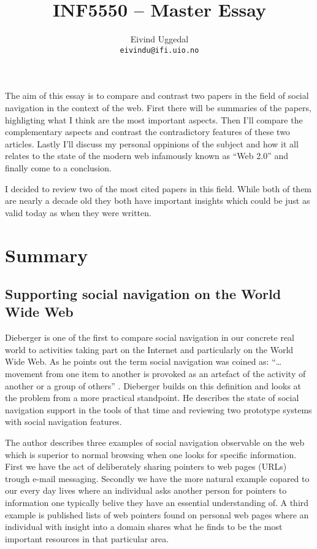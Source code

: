 \documentclass[12pt,a4paper]{article}
\author{Eivind Uggedal\\
  \texttt{eivindu@ifi.uio.no}}
\title{INF5550 -- Master Essay}
\begin{document}
\maketitle{}

The aim of this essay is to compare and contrast two papers in the field of
social navigation in the context of the web. First there will be summaries
of the papers, highligting what I think are the most important aspects.
Then I'll compare the complementary aspects and contrast the contradictory
features of these two articles. Lastly I'll discuss my personal
oppinions of the subject and how it all relates to the state of the modern web
infamously known as ``Web 2.0'' and finally come to a conclusion.

I decided to review two of the most cited papers in this field. While both of
them are nearly a decade old they both have important insights which could be
just as valid today as when they were written.

\cite{wexelblat99}
\cite{dieberger97}

\section{Summary}

\subsection{Supporting social navigation on the World Wide Web}

Dieberger is one of the first to compare social navigation in our concrete
real world to activities taking part on the Internet and particularly on the
World Wide Web. As he points out the term social navigation was coined as:
``\ldots movement from one item to another is provoked as an artefact of the
activity of another or a group of others'' \cite{dourish94}. Dieberger builds
on this definition and looks at the problem from a more practical standpoint.
He describes the state of social navigation support in the tools of that time
and reviewing two prototype systems with social navigation features.

The author describes three examples of social navigation observable on the web
which is superior to
normal browsing when one looks for specific information. First we have the
act of deliberately sharing pointers to web pages (URLs) trough e-mail
messaging. Secondly we have the more natural example copared to our every day
lives where an individual asks another person for pointers to information one
typically belive they have an essential understanding of. A third example is
published lists of web pointers found on personal web pages where an
individual with insight into a domain shares what he finds to be the most
important resources in that particular area.
\end{document}
